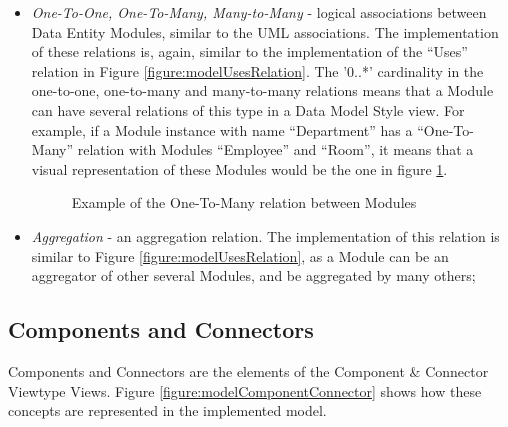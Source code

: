 \begin{itemize}
\item \textit{One-To-One, One-To-Many, Many-to-Many} - logical associations between Data Entity Modules, similar to the UML associations. The implementation of these relations is, again, similar to the implementation of the ``Uses'' relation in Figure \ref{figure:modelUsesRelation}. The '0..*' cardinality in the one-to-one, one-to-many and many-to-many relations means that a Module can have several relations of this type in a Data Model Style view. For example, if a Module instance with name ``Department'' has a ``One-To-Many'' relation with Modules ``Employee'' and ``Room'', it means that a visual representation of these Modules would be the one in figure \ref{figure:modelOneToManyExample}.
\begin{figure}[h]
\centering
\renewcommand {\umltextcolor}{black}
\renewcommand {\umlfillcolor}{none}
\renewcommand {\umldrawcolor}{black}
\caption{Example of the One-To-Many relation between Modules}
\label{figure:modelOneToManyExample}
\end{figure}

\item \textit{Aggregation} - an aggregation relation. The implementation of this relation is similar to Figure \ref{figure:modelUsesRelation}, as a Module can be an aggregator of other several Modules, and be aggregated by many others;
\end{itemize}

\subsection{Components and Connectors}
\label{subsection:modelComponentsConnectors}
Components and Connectors are the elements of the Component \& Connector Viewtype Views. Figure \ref{figure:modelComponentConnector} shows how these concepts are represented in the implemented model.

